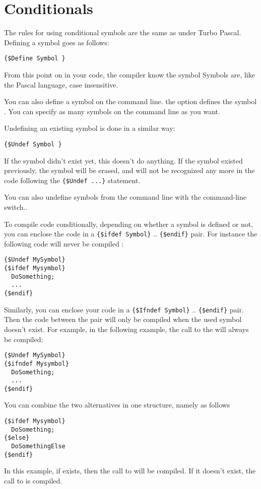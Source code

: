 \documentclass{report}
\begin{document}
\section{Conditionals}
\label{se:Conditionals}
The rules for using conditional symbols are the same as under Turbo Pascal.
Defining a symbol goes as follows:
\begin{verbatim}
{$Define Symbol }
\end{verbatim}
From this point on in your code, the compiler know the symbol 
Symbols are, like the Pascal language, case insensitive.

You can also define a symbol on the command line. the  option
defines the symbol . You can specify as many symbols on the
command line as you want.

Undefining an existing symbol is done in a similar way:
\begin{verbatim}
{$Undef Symbol }
\end{verbatim}
If the symbol didn't exist yet, this doesn't do anything. If the symbol
existed previously, the symbol will be erased, and will not be recognized
any more in the code following the \verb|{$Undef ...}| statement.

You can also undefine symbols from the command line with the 
command-line switch..

To compile code conditionally, depending on whether a symbol is defined or
not, you can enclose the code in a \verb|{$ifdef Symbol}| .. \verb|{$endif}|
pair. For instance the following code will never be compiled :
\begin{verbatim}
{$Undef MySymbol}
{$ifdef Mysymbol}
  DoSomething;
  ...
{$endif}
\end{verbatim}

Similarly, you can enclose your code in a \verb|{$Ifndef Symbol}| .. \verb|{$endif}|
pair. Then the code between the pair will only be compiled when the used
symbol doesn't exist. For example, in the following example, the call to the
 will always be compiled:
\begin{verbatim}
{$Undef MySymbol}
{$ifndef Mysymbol}
  DoSomething;
  ...
{$endif}
\end{verbatim}

You can combine the two alternatives in one structure, namely as follows
\begin{verbatim}
{$ifdef Mysymbol}
  DoSomething;
{$else}
  DoSomethingElse
{$endif}
\end{verbatim}
In this example, if  exists, then the call to 
will be compiled. If it doesn't exist, the call to  is
compiled.
\end{document}
